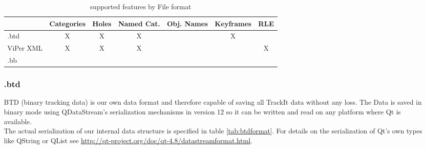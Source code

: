    \begin{table}[H]
     \centering
     \label{features} 
     \caption{supported features by File format}
      \begin{tabular}[]{|l|c|c|c|c|c|c|}
         \hline
                 & Categories&  Holes     & Named Cat. & Obj. Names & Keyframes  & RLE\\\hline
         .btd    &    X      &   X        &     X      &            &     X      & \\\hline
        ViPer XML&    X      &   X        &     X      &          &              &  X \\\hline
        .bb      &           &            &            &            &           &  \\\hline
         \hline
      \end{tabular}
   \end{table}
  
   \subsubsection{.btd}
      BTD (binary tracking data) is our own data format and therefore capable of saving all TrackIt data without any loss. The Data is saved in binary mode using QDataStream's serialization mechanisms in version 12 so it can be written and read on any platform where Qt is available. \\
      The actual serialization of our internal data structure is specified in table \ref{tab:btdformat}.  For details on the serialization of Qt's own types like QString or QList see \href{http://qt-project.org/doc/qt-4.8/datastreamformat.html}{http://qt-project.org/doc/qt-4.8/datastreamformat.html}.


